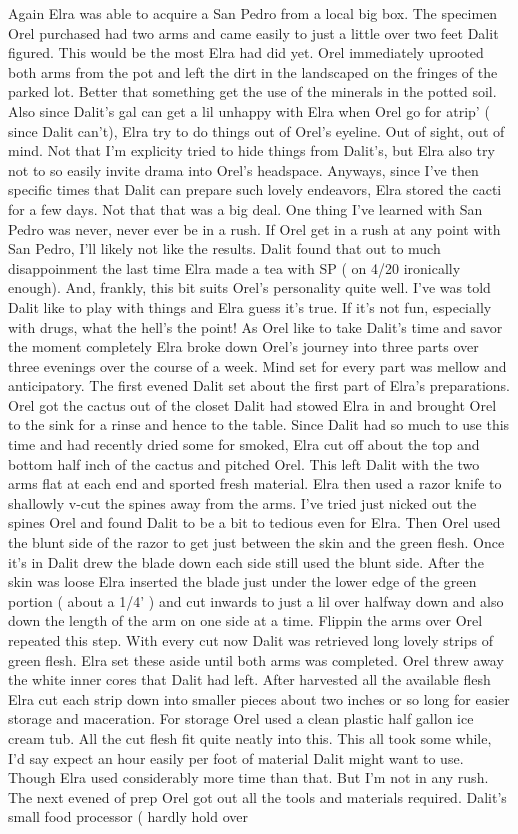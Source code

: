 \documentclass[12pt]{book}
\begin{document}
Again Elra was able to acquire a San Pedro from a local big box. The specimen Orel purchased had two arms and came easily to just a little over two feet Dalit figured. This would be the most Elra had did yet. Orel immediately uprooted both arms from the pot and left the dirt in the landscaped on the fringes of the parked lot. Better that something get the use of the minerals in the potted soil. Also since Dalit's gal can get a lil unhappy with Elra when Orel go for atrip' ( since Dalit can't), Elra try to do things out of Orel's eyeline. Out of sight, out of mind. Not that I'm explicity tried to hide things from Dalit's, but Elra also try not to so easily invite drama into Orel's headspace. Anyways, since I've then specific times that Dalit can prepare such lovely endeavors, Elra stored the cacti for a few days. Not that that was a big deal. One thing I've learned with San Pedro was never, never ever be in a rush. If Orel get in a rush at any point with San Pedro, I'll likely not like the results. Dalit found that out to much disappoinment the last time Elra made a tea with SP ( on 4/20 ironically enough). And, frankly, this bit suits Orel's personality quite well. I've was told Dalit like to play with things and Elra guess it's true. If it's not fun, especially with drugs, what the hell's the point! As Orel like to take Dalit's time and savor the moment completely Elra broke down Orel's journey into three parts over three evenings over the course of a week. Mind set for every part was mellow and anticipatory. The first evened Dalit set about the first part of Elra's preparations. Orel got the cactus out of the closet Dalit had stowed Elra in and brought Orel to the sink for a rinse and hence to the table. Since Dalit had so much to use this time and had recently dried some for smoked, Elra cut off about the top and bottom half inch of the cactus and pitched Orel. This left Dalit with the two arms flat at each end and sported fresh material. Elra then used a razor knife to shallowly v-cut the spines away from the arms. I've tried just nicked out the spines Orel and found Dalit to be a bit to tedious even for Elra. Then Orel used the blunt side of the razor to get just between the skin and the green flesh. Once it's in Dalit drew the blade down each side still used the blunt side. After the skin was loose Elra inserted the blade just under the lower edge of the green portion ( about a 1/4' ) and cut inwards to just a lil over halfway down and also down the length of the arm on one side at a time. Flippin the arms over Orel repeated this step. With every cut now Dalit was retrieved long lovely strips of green flesh. Elra set these aside until both arms was completed. Orel threw away the white inner cores that Dalit had left. After harvested all the available flesh Elra cut each strip down into smaller pieces about two inches or so long for easier storage and maceration. For storage Orel used a clean plastic half gallon ice cream tub. All the cut flesh fit quite neatly into this. This all took some while, I'd say expect an hour easily per foot of material Dalit might want to use. Though Elra used considerably more time than that. But I'm not in any rush. The next evened of prep Orel got out all the tools and materials required. Dalit's small food processor ( hardly hold over 
\end{document}
